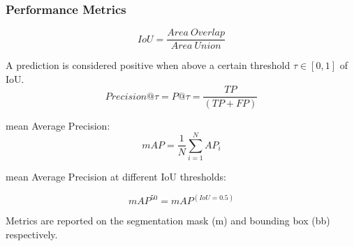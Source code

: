 \documentclass[aspectratio=1610]{beamer}
\begin{document}
\begin{frame}
  \frametitle{Performance Metrics}
\begin{equation}
    IoU = \frac{Area \: Overlap}{Area \: Union}
    \label{eqn:iou}
\end{equation}

A prediction is considered positive when above a certain threshold $\tau \in [0,1]$ of IoU.
\begin{equation}
    Precision @ \tau = P@\tau = \frac{TP}{(TP + FP)}
    \label{eqn:precision}
\end{equation}

mean Average Precision:
\begin{equation}
mAP = \frac{1}{N} \sum_{i=1}^{N} AP_i
    \label{eqn:map}
\end{equation}

mean Average Precision at different IoU thresholds:

\begin{equation}
mAP^{50} = mAP^{(IoU=0.5)}
    \label{eqn:map}
\end{equation}

Metrics are reported on the segmentation mask (m) and bounding box (bb) respectively.

\end{frame}
\normalpage
\end{document}

